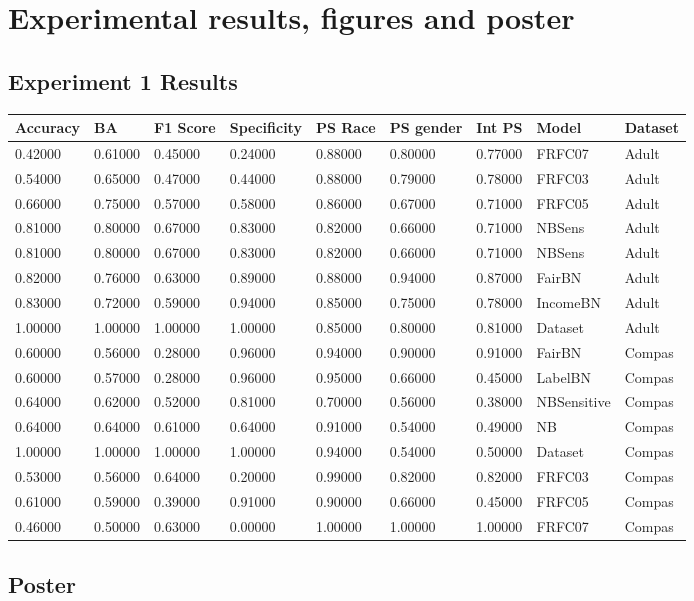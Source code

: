 \chapter{Experimental results, figures and poster}

\section{Experiment 1 Results}
\label{app:experiment1}

\begin{landscape}
\begin{table}[H]
\centering
\begin{tabular}{|l|l|l|l|l|l|l|l|l|}
\hline
\textbf{Accuracy} & \textbf{BA} & \textbf{F1 Score} & \textbf{Specificity} & \textbf{PS Race} & \textbf{PS gender} & \textbf{Int PS} & \textbf{Model} & \textbf{Dataset} \\ \hline
0.42000 & 0.61000 & 0.45000 & 0.24000 & 0.88000 & 0.80000 & 0.77000 & FRFC07      & Adult  \\ \hline
0.54000 & 0.65000 & 0.47000 & 0.44000 & 0.88000 & 0.79000 & 0.78000 & FRFC03      & Adult  \\ \hline
0.66000 & 0.75000 & 0.57000 & 0.58000 & 0.86000 & 0.67000 & 0.71000 & FRFC05      & Adult  \\ \hline
0.81000 & 0.80000 & 0.67000 & 0.83000 & 0.82000 & 0.66000 & 0.71000 & NBSens      & Adult  \\ \hline
0.81000 & 0.80000 & 0.67000 & 0.83000 & 0.82000 & 0.66000 & 0.71000 & NBSens      & Adult  \\ \hline
0.82000 & 0.76000 & 0.63000 & 0.89000 & 0.88000 & 0.94000 & 0.87000 & FairBN      & Adult  \\ \hline
0.83000 & 0.72000 & 0.59000 & 0.94000 & 0.85000 & 0.75000 & 0.78000 & IncomeBN    & Adult  \\ \hline
1.00000 & 1.00000 & 1.00000 & 1.00000 & 0.85000 & 0.80000 & 0.81000 & Dataset     & Adult  \\ \hline
0.60000 & 0.56000 & 0.28000 & 0.96000 & 0.94000 & 0.90000 & 0.91000 & FairBN      & Compas \\ \hline
0.60000 & 0.57000 & 0.28000 & 0.96000 & 0.95000 & 0.66000 & 0.45000 & LabelBN     & Compas \\ \hline
0.64000 & 0.62000 & 0.52000 & 0.81000 & 0.70000 & 0.56000 & 0.38000 & NBSensitive & Compas \\ \hline
0.64000 & 0.64000 & 0.61000 & 0.64000 & 0.91000 & 0.54000 & 0.49000 & NB          & Compas \\ \hline
1.00000 & 1.00000 & 1.00000 & 1.00000 & 0.94000 & 0.54000 & 0.50000 & Dataset     & Compas \\ \hline
0.53000 & 0.56000 & 0.64000 & 0.20000 & 0.99000 & 0.82000 & 0.82000 & FRFC03      & Compas \\ \hline
0.61000 & 0.59000 & 0.39000 & 0.91000 & 0.90000 & 0.66000 & 0.45000 & FRFC05      & Compas \\ \hline
0.46000 & 0.50000 & 0.63000 & 0.00000 & 1.00000 & 1.00000 & 1.00000 & FRFC07      & Compas \\ \hline
\end{tabular}
\end{table}
\end{landscape}

\section{Poster}

